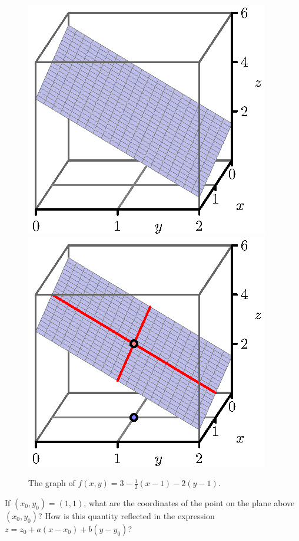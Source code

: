 \begin{pa}
  \begin{figure}[ht]
    \begin{center}
      \includegraphics{figures/fig_10_4_tangent_8.eps}
      \hspace*{20pt}
      \includegraphics{figures/fig_10_4_tangent_7.eps}
    \end{center}
    \caption{The graph of $f(x,y)=3-\frac12(x-1)-2(y-1)$.}
    \label{F:10.4.tangent.7}
  \end{figure}

  \ba
  \item If $(x_0,y_0)=(1,1)$, what are the coordinates of the point on
    the plane above $(x_0,y_0)$?  How is this quantity reflected in
    the expression $z=z_0 + a(x-x_0) + b(y-y_0)$?


\end{pa}
